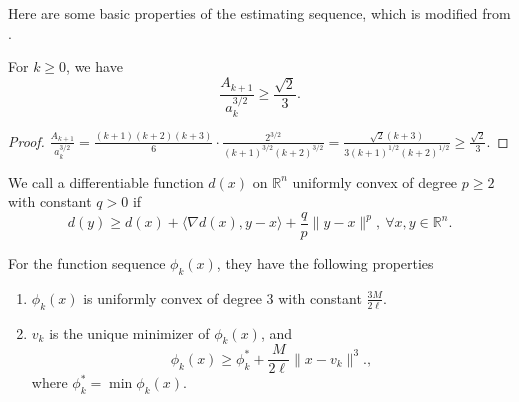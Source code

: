 \documentclass{article}
\begin{document}
Here are some basic properties of the estimating sequence, which is modified from \citet{nesterov_lectures_2018}.
\begin{lemma}
    \label{lem.magnitude a and A}
    For $k\geq 0$, we have
    \begin{equation}
        \label{eq.magnitude a and A}
        \frac{A_{k+1}}{a_k^{3/2}} \geq \frac{\sqrt{2}}{3}.
    \end{equation}
\end{lemma}
\begin{proof}
    $\frac{A_{k+1}}{a_k^{3/2}}= \frac{(k+1)(k+2)(k+3)}{6}\cdot \frac{2^{3/2}}{(k+1)^{3/2}(k+2)^{3/2}} = \frac{\sqrt{2}(k+3)}{3(k+1)^{1/2}(k+2)^{1/2}} \geq \frac{\sqrt{2}}{3}.$
\end{proof}
We call a differentiable function $d(x)$ on $\mathbb{R}^n$ uniformly convex \citet[Section 4.2.2]{nesterov_lectures_2018} of degree $p\geq 2$ with constant $q>0$ if
\begin{equation}
    \label{eq.uniformly convex of p}
    d(y)\geq d(x)+\langle \nabla d(x),y-x\rangle +\frac{q}{p}\|y-x\|^p, \ \forall x,y\in\mathbb{R}^n.
\end{equation}
\begin{lemma}
    \label{lem.property of phi}
    For the function sequence $\phi_k(x)$, they have the following properties
    \begin{enumerate}
        \item $\phi_k(x)$ is uniformly convex of degree $3$ with constant $\frac{3M}{2\ell}$.
        \item $v_k$ is the unique minimizer of $\phi_k(x)$, and 
        \begin{equation}
            \label{eq.phi_k phi_low}
            \phi_k(x)\geq \phi_k^* + \frac{M}{2\ell}\|x-v_k\|^3.,
        \end{equation}
        where $\phi_k^* =\min \phi_k(x).$
    \end{enumerate}
\end{lemma}
\end{document}
